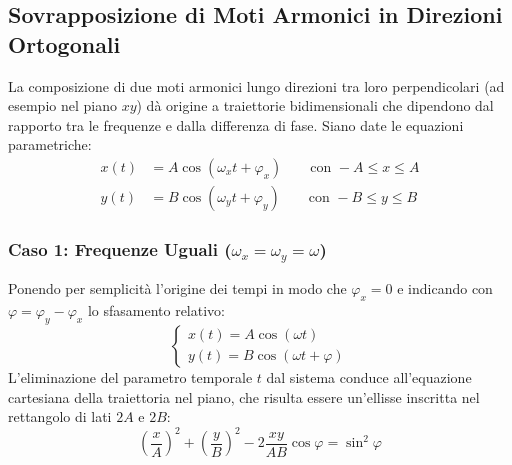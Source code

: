 \subsection{Sovrapposizione di Moti Armonici in Direzioni Ortogonali}
La composizione di due moti armonici lungo direzioni tra loro perpendicolari (ad esempio nel piano $xy$) dà origine a traiettorie bidimensionali che dipendono dal rapporto tra le frequenze e dalla differenza di fase. Siano date le equazioni parametriche:
\begin{align*}
x(t) &= A \cos(\omega_x t + \varphi_x) \qquad \text{con } -A \le x \le A \\
y(t) &= B \cos(\omega_y t + \varphi_y) \qquad \text{con } -B \le y \le B
\end{align*}

\subsubsection{Caso 1: Frequenze Uguali ($\omega_x = \omega_y = \omega$)}
Ponendo per semplicità l'origine dei tempi in modo che $\varphi_x = 0$ e indicando con $\varphi = \varphi_y - \varphi_x$ lo sfasamento relativo:
\begin{equation}
    \begin{cases} x(t) = A \cos(\omega t) \\ y(t) = B \cos(\omega t + \varphi) \end{cases}
\end{equation}
L'eliminazione del parametro temporale $t$ dal sistema conduce all'equazione cartesiana della traiettoria nel piano, che risulta essere un'ellisse inscritta nel rettangolo di lati $2A$ e $2B$:
\begin{equation}
    \left(\frac{x}{A}\right)^2 + \left(\frac{y}{B}\right)^2 - 2\frac{xy}{AB}\cos\varphi = \sin^2\varphi
\end{equation}

